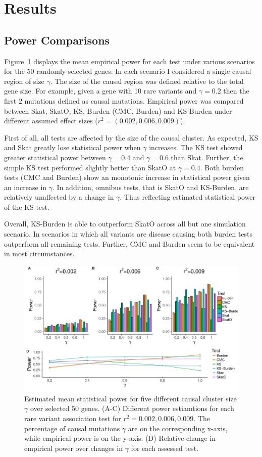 \section{Results}
\label{sec:results}

\subsection{Power Comparisons}
\label{sub:power_comparisons}

Figure~\ref{fig:simulatedGeneRealData} displays the mean empirical power for each test under various scenarios for the 50 randomly selected genes.
In each scenario I considered a single causal region of size $\gamma$.
The size of the causal region was defined relative to the total gene size.
For example, given a gene with 10 rare variants and $\gamma=0.2$ then the first $2$ mutations defined as causal mutations.
Empirical power was compared between Skat, SkatO, KS, Burden (CMC, Burden) and KS-Burden under different assumed effect sizes ($r^2=(0.002, 0.006, 0.009)$).

First of all, all tests are affected by the size of the causal cluster.
As expected, KS and Skat greatly lose statistical power when $\gamma$ increases.
The KS test showed greater statistical power between $\gamma=0.4$ and $\gamma=0.6$ than Skat.
Further, the simple KS test performed slightly better than SkatO at $\gamma=0.4$.
Both burden tests (CMC and Burden) show an monotonic increase in statistical power given an increase in $\gamma$.
In addition, omnibus tests, that is SkatO and KS-Burden, are relatively unaffected by a change in $\gamma$.
Thus reflecting estimated statistical power of the KS test.

Overall, KS-Burden is able to outperform SkatO across all but one simulation scenario.
In scenarios in which all variants are disease causing both burden tests outperform all remaining tests.
Further, CMC and Burden seem to be equivalent in most circumstances.

\begin{figure}[ht!]
  \centering
  \includegraphics[width=0.8\linewidth]{figures/combined_power_analysis.pdf}
  \caption{Estimated mean statistical power for five different causal cluster size $\gamma$ over selected 50 genes.
    (A-C) Different power estiamtions for each rare variant association test for $r^2=0.002, 0.006, 0.009$.
    The percentage of causal mutations $\gamma$ are on the corresponding x-axis, while empirical power is on the y-axis.
    (D) Relative change in empirical power over changes in $\gamma$ for each assessed test.\label{fig:simulatedGeneRealData}}
\end{figure}

